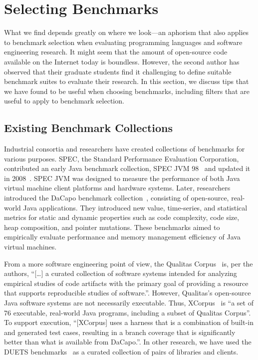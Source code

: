 \section{Selecting Benchmarks}
\label{sec:selecting-benchmarks}
What we find depends greatly on where we look---an aphorism that also applies to benchmark selection when evaluating programming languages and software engineering research. 
It might seem that the amount of open-source code available on the Internet today is boundless. However, the second author has observed that their graduate students find it challenging to define suitable benchmark suites to evaluate their research. 
In this section, we discuss tips that we have found to be useful when choosing benchmarks, including filters that are useful to apply to benchmark selection.

\subsection{Existing Benchmark Collections}
Industrial consortia and researchers have created collections of benchmarks for various purposes. SPEC, the Standard Performance Evaluation Corporation, contributed an early Java benchmark collection, SPEC JVM 98~\cite{SPECjvm98} and updated it in 2008~\cite{SPECjvm2008}. SPEC JVM was designed to measure the performance of both Java virtual machine client platforms and hardware systems. Later, researchers introduced the DaCapo benchmark collection~\cite{DaCapo_inproceedings}, consisting of open-source, real-world Java applications. 
They introduced new value, time-series, and statistical metrics for static and dynamic properties such as code complexity, code size, heap composition, and pointer mutations. These benchmarks aimed to empirically evaluate performance and memory management efficiency of Java virtual machines.

From a more software engineering point of view, the Qualitas Corpus~\cite{QualitasCorpus} is, per the authors, ``[\ldots] a curated collection of software systems intended for analyzing empirical studies of code artifacts with the primary goal of providing a resource that supports reproducible studies of software.''. However, Qualitas's open-source Java software systems are not necessarily executable. Thus, XCorpus~\cite{XCorpus} is ``a set of 76 executable, real-world Java programs, including a subset of Qualitas Corpus''. To support execution, ``[XCorpus] uses a harness that is a combination of built-in and generated test cases, resulting in a branch coverage that is significantly better than what is available from DaCapo.''. In other research, we have used the DUETS benchmarks~\cite{durieux21} as a curated collection of pairs of libraries and clients.

